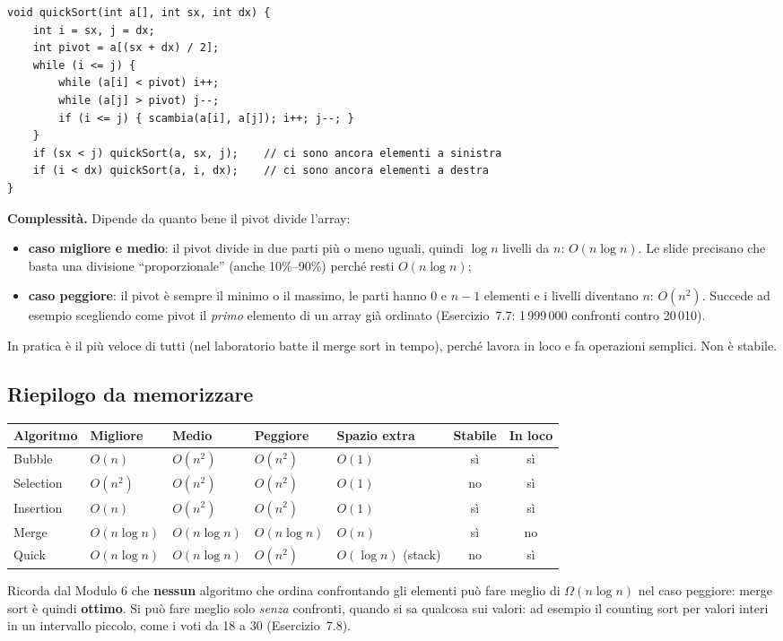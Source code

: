 \begin{lstlisting}
void quickSort(int a[], int sx, int dx) {
    int i = sx, j = dx;
    int pivot = a[(sx + dx) / 2];
    while (i <= j) {
        while (a[i] < pivot) i++;
        while (a[j] > pivot) j--;
        if (i <= j) { scambia(a[i], a[j]); i++; j--; }
    }
    if (sx < j) quickSort(a, sx, j);    // ci sono ancora elementi a sinistra
    if (i < dx) quickSort(a, i, dx);    // ci sono ancora elementi a destra
}
\end{lstlisting}

\textbf{Complessità.} Dipende da quanto bene il pivot divide l'array:
\begin{itemize}
  \item \textbf{caso migliore e medio}: il pivot divide in due parti più o meno
        uguali, quindi $\log n$ livelli da $n$: $O(n \log n)$. Le slide precisano
        che basta una divisione ``proporzionale'' (anche 10\%--90\%) perché resti
        $O(n \log n)$;
  \item \textbf{caso peggiore}: il pivot è sempre il minimo o il massimo, le parti
        hanno $0$ e $n-1$ elementi e i livelli diventano $n$: $O(n^2)$. Succede ad
        esempio scegliendo come pivot il \emph{primo} elemento di un array già
        ordinato (Esercizio~7.7: 1\,999\,000 confronti contro 20\,010).
\end{itemize}
In pratica è il più veloce di tutti (nel laboratorio batte il merge sort in tempo),
perché lavora in loco e fa operazioni semplici. Non è stabile.

\subsection*{Riepilogo da memorizzare}

\begin{center}\small
\begin{tabular}{lllllcc}
\toprule
\textbf{Algoritmo} & \textbf{Migliore} & \textbf{Medio} & \textbf{Peggiore} & \textbf{Spazio extra} & \textbf{Stabile} & \textbf{In loco} \\
\midrule
Bubble    & $O(n)$       & $O(n^2)$      & $O(n^2)$      & $O(1)$      & sì & sì \\
Selection & $O(n^2)$     & $O(n^2)$      & $O(n^2)$      & $O(1)$      & no & sì \\
Insertion & $O(n)$       & $O(n^2)$      & $O(n^2)$      & $O(1)$      & sì & sì \\
Merge     & $O(n\log n)$ & $O(n\log n)$  & $O(n\log n)$  & $O(n)$      & sì & no \\
Quick     & $O(n\log n)$ & $O(n\log n)$  & $O(n^2)$      & $O(\log n)$ (stack) & no & sì \\
\bottomrule
\end{tabular}
\end{center}
Ricorda dal Modulo 6 che \textbf{nessun} algoritmo che ordina confrontando gli
elementi può fare meglio di $\Omega(n \log n)$ nel caso peggiore: merge sort è
quindi \textbf{ottimo}. Si può fare meglio solo \emph{senza} confronti, quando si
sa qualcosa sui valori: ad esempio il counting sort per valori interi in un
intervallo piccolo, come i voti da 18 a 30 (Esercizio~7.8).

